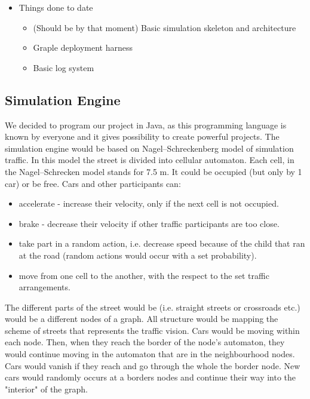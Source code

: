 \begin{itemize}
\begin{itemize}
	\end{itemize}

	\item Things done to date
	\begin{itemize}
		\item (Should be by that moment) Basic simulation skeleton and architecture
		\item Graple deployment harness
		\item Basic log system
	\end{itemize}

\end{itemize}

\subsection{Simulation Engine} 

We decided to program our project in Java, as this programming language is known by everyone and it gives possibility to create powerful projects. The simulation engine would be based on Nagel–Schreckenberg model of simulation traffic. In this model the street is divided into cellular automaton. Each cell, in the Nagel–Schrecken model stands for 7.5 m. It could be occupied (but only by 1 car) or be free. Cars and other participants can:
	\begin{itemize}
		\item accelerate - increase their velocity, only if the next cell is not occupied.
		\item brake - decrease their  velocity if other traffic participants are too close. 
		\item take part in a random action, i.e. decrease speed because of the child that ran at the road (random actions would occur with a set probability). 
		\item move from one cell to the another, with the respect to the set traffic arrangements. 
	\end{itemize}
	
The different parts of the street would be (i.e. straight streets or crossroads etc.) would be a different nodes of a graph. All structure would be mapping the scheme of streets that represents the traffic vision. Cars would be moving within each node. Then, when they reach the border of the node's automaton, they  would continue moving in the automaton that are in the neighbourhood nodes. Cars would vanish if they reach and go through the whole the border node.  New cars would randomly occurs at a borders nodes and continue their way into the "interior" of the graph. 
	


